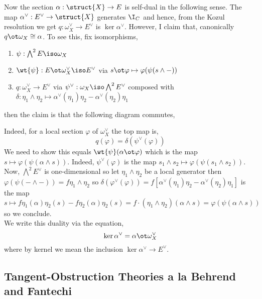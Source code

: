 \documentclass[12pt]{article}
\begin{document}
Now the section $\alpha : \struct{X} \to E$ is self-dual in the following sense. The map $\alpha^\vee : E^\vee \to \struct{X}$ generates $\I_C$ and hence, from the Kozul resolution we get $q : \omega_X^\vee \to E^\vee$ is $\ker{\alpha^\vee}$. However, I claim that, canonically $q \ot \omega_X \cong \alpha$. To see this, fix isomorphisms,
\begin{enumerate}
\item $\psi : \bigwedge^2 E \iso \omega_X$
\item $\wt{\psi} : E \ot \omega_X^\vee \iso E^\vee$ via $s \ot \varphi \mapsto \varphi(\psi(s \wedge -))$
\item $q : \omega_X^\vee \to E^\vee$ via $\psi^\vee : \omega_X \iso \bigwedge^2 E^\vee$ composed with $\delta : \eta_1 \wedge \eta_2 \mapsto \alpha^\vee(\eta_1) \eta_2 - \alpha^\vee(\eta_2) \eta_1$
\end{enumerate}
then the claim is that the following diagram commutes,
\begin{center}
\end{center}
Indeed, for a local section $\varphi$ of $\omega_X^\vee$ the top map is,
\[ q(\varphi) = \delta(\psi^\vee(\varphi)) \]
We need to show this equals $\wt{\psi}(\alpha \ot \varphi)$ which is the map $s \mapsto \varphi(\psi(\alpha \wedge s))$. Indeed, $\psi^\vee(\varphi)$ is the map $s_1 \wedge s_2 \mapsto \varphi(\psi(s_1 \wedge s_2))$. Now, $\bigwedge^2 E^\vee$ is one-dimensional so let $\eta_1 \wedge \eta_2$ be a local generator then $\varphi(\psi(- \wedge -)) = f \eta_1 \wedge \eta_2$ so $\delta(\varphi^\vee(\varphi)) = f [\alpha^\vee(\eta_1) \eta_2 - \alpha^\vee(\eta_2) \eta_1]$ is the map $s \mapsto f \eta_1(\alpha) \eta_2(s) - f \eta_2(\alpha) \eta_2(s) = f \cdot (\eta_1 \wedge \eta_2)(\alpha \wedge s) = \varphi(\psi(\alpha \wedge s))$ so we conclude.  
\bigskip\\
We write this duality via the equation,
\[ \ker{\alpha^\vee} = \alpha \ot \omega_X^\vee \]
where by kernel we mean the inclusion $\ker{\alpha^\vee} \to E^\vee$.

\subsection{Tangent-Obstruction Theories a la Behrend and Fantechi}
\end{document}
